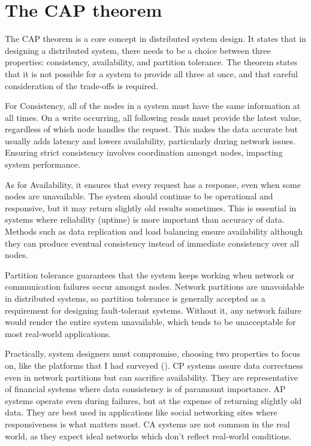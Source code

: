 \documentclass[]{final}
\begin{document}
\section{The CAP theorem}

The CAP theorem is a core concept in distributed system design. It states that
in designing a distributed system, there needs to be a choice between three
properties: consistency, availability, and partition tolerance. The theorem
states that it is not possible for a system to provide all three at once,
and that careful consideration of the trade-offs is required.

For Consistency, all of the nodes in a system must have the same information
at all times. On a write occurring, all following reads must provide the latest
value, regardless of which node handles the request. This makes the data
accurate but usually adds latency and lowers availability, particularly
during network issues. Ensuring strict consistency involves coordination
amongst nodes, impacting system performance.

As for Availability, it ensures that every request has a response, even when
some nodes are unavailable. The system should continue to be operational and
responsive, but it may return slightly old results sometimes. This is
essential in systems where reliability (uptime) is more important than
accuracy of data. Methods such as data replication and load balancing
ensure availability although they can produce eventual consistency instead
of immediate consistency over all nodes.

Partition tolerance guarantees that the system keeps working when network or
communication failures occur amongst nodes. Network partitions are unavoidable
in distributed systems, so partition tolerance is generally accepted as a
requirement for designing fault-tolerant systems. Without it, any network
failure would render the entire system unavailable, which tends to be
unacceptable for most real-world applications.


Practically, system designers must compromise, choosing two properties to focus
on, like the platforms that I had surveyed {\hypersetup{linkcolor=teal}(\pageref{survey})}.
CP systems assure data correctness even in network partitions but
can sacrifice availability. They are representative of financial systems
where data consistency is of paramount importance. AP systems operate even
during failures, but at the expense of returning slightly old data. They
are best used in applications like social networking sites where
responsiveness is what matters most. CA systems are not common in the
real world, as they expect ideal networks which don't reflect
real-world conditions.
\end{document}
